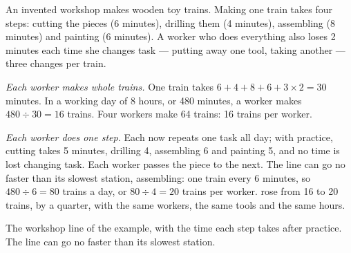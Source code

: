 \begin{example}
An invented workshop makes wooden toy trains. Making one train takes four steps:
cutting the pieces (6 minutes), drilling them (4 minutes), assembling (8 minutes)
and painting (6 minutes). A worker who does everything also loses 2 minutes each
time she changes task --- putting away one tool, taking another --- three changes
per train.

\emph{Each worker makes whole trains.} One train takes $6 + 4 + 8 + 6 + 3 \times 2 =
30$ minutes. In a working day of 8 hours, or 480 minutes, a worker makes $480 \div
30 = 16$ trains. Four workers make 64 trains: 16 trains per worker.

\emph{Each worker does one step.} Each now repeats one task all day; with practice,
cutting takes 5 minutes, drilling 4, assembling 6 and painting 5, and no time is lost
changing task. Each worker passes the piece to the next. The line can go no faster
than its slowest station, assembling: one train every 6 minutes, so $480 \div 6 =
80$ trains a day, or $80 \div 4 = 20$ trains per worker.  rose from
16 to 20 trains, by a quarter, with the same workers, the same tools and the same
hours.
\end{example}

\begin{omfigure}

{\small The workshop line of the example, with the time each step takes after
practice. The line can go no faster than its slowest station.}
\end{omfigure}

